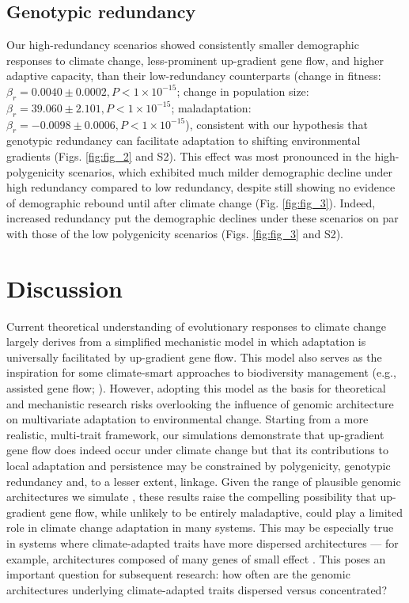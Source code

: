 \documentclass[9pt,twocolumn,twoside,lineno]{new_article}
\begin{document}
\subsection*{Genotypic redundancy}
Our high-redundancy scenarios showed
consistently smaller demographic responses to climate change,
less-prominent up-gradient gene flow, and higher adaptive capacity,
than their low-redundancy counterparts 
(change in fitness: $\beta_{r} = 0.0040\pm0.0002, P<1\times10^{-15}$;
change in population size: $\beta_{r} = 39.060\pm2.101, P<1\times10^{-15}$;
maladaptation: $\beta_{r} = -0.0098\pm0.0006, P<1\times10^{-15}$), consistent with our hypothesis that
genotypic redundancy can facilitate adaptation to shifting environmental gradients (Figs. \ref{fig:fig_2} and S2).
This effect was most pronounced in the high-polygenicity scenarios,
which exhibited much milder demographic decline under high redundancy compared to low redundancy,
despite still showing no evidence of demographic rebound until after climate change (Fig. \ref{fig:fig_3}).
Indeed, increased redundancy put the demographic
declines under these scenarios on par with those
of the low polygenicity scenarios (Figs. \ref{fig:fig_3} and S2).


\section*{Discussion}

Current theoretical understanding of evolutionary responses to climate change
largely derives from a simplified mechanistic model in which
adaptation is universally facilitated by up-gradient gene flow.
This model also serves as the inspiration for some climate-smart
approaches to biodiversity management
(e.g., assisted gene flow; \cite{aitken_whitlock}).
However, adopting this model as the basis
for theoretical and mechanistic research
risks overlooking the influence of
genomic architecture on multivariate adaptation to environmental change.
Starting from a more realistic, multi-trait framework,
our simulations demonstrate that up-gradient gene flow does indeed
occur under climate change
but that its contributions to local adaptation and persistence may be constrained
by polygenicity, genotypic redundancy and, to a lesser extent, linkage.
Given the range of plausible genomic architectures we simulate
\cite{barghi_polygenic,boyle,rockman,savolainen,sella,bomblies},
these results raise the compelling
possibility that up-gradient gene flow, while unlikely
to be entirely maladaptive, could play a limited role in
climate change adaptation in many systems.
This may be especially true in systems where climate-adapted traits
have more dispersed architectures --- for example, architectures composed of many genes of small effect \cite{yeaman_review}.
This poses an important question for subsequent research:
how often are the genomic architectures underlying climate-adapted traits dispersed
versus concentrated?
\end{document}
